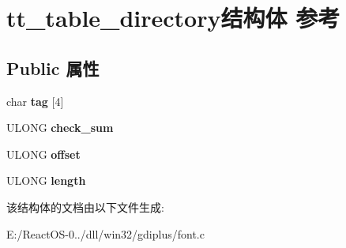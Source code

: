 \hypertarget{structtt__table__directory}{}\section{tt\+\_\+table\+\_\+directory结构体 参考}
\label{structtt__table__directory}
\subsection*{Public 属性}
\begin{DoxyCompactItemize}
\item 
\mbox{\label{structtt__table__directory_a5776d4087f0dcec87c596ee2fc4e37ac}} 
char {\bfseries tag} \mbox{[}4\mbox{]}
\item 
\mbox{\label{structtt__table__directory_a99d47aac9ee9fb081b459e6e311750ca}} 
U\+L\+O\+NG {\bfseries check\+\_\+sum}
\item 
\mbox{\label{structtt__table__directory_ae816dca2e1aace80b5b30ce8b291b8b2}} 
U\+L\+O\+NG {\bfseries offset}
\item 
\mbox{\label{structtt__table__directory_ace1372a35c747588240afe053711a5e1}} 
U\+L\+O\+NG {\bfseries length}
\end{DoxyCompactItemize}


该结构体的文档由以下文件生成\+:\begin{DoxyCompactItemize}
\item 
E\+:/\+React\+O\+S-\/0../dll/win32/gdiplus/font.\+c\end{DoxyCompactItemize}
